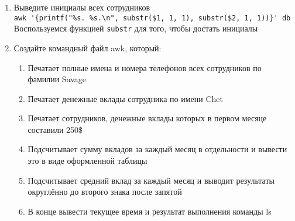 \documentclass[12pt, a4paper]{article}
\begin{document}
\begin{enumerate}
    \verb|awk -F ":" '/^Mike/ {printf("$%s, $%s, $%s\n", $3, $4, $5)}' db|\\
    Воспользуемся функцией \verb|printf| чтобы отформатировать строку согласно
    заданию
  \item Выведите инициалы всех сотрудников\\
    \verb|awk '{printf("%s. %s.\n", substr($1, 1, 1), substr($2, 1, 1))}' db|\\
    Воспользуемся функцией \verb|substr| для того, чтобы достать инициалы
  \item Создайте командный файл awk, который:
    \begin{enumerate}
      \item Печатает полные имена и номера телефонов всех сотрудников по фамилии Savage
      \item Печатает денежные вклады сотрудника по имени Chet
      \item Печатает сотрудников, денежные вклады которых в первом месяце составили 250\$
      \item Подсчитывает сумму вкладов за каждый месяц в отдельности и вывести это в виде оформленной таблицы
      \item Подсчитывает средний вклад за каждый месяц и выводит результаты округлённо до второго знака после запятой
      \item В конце вывести текущее время и результат выполнения команды ls
    \end{enumerate}
\end{enumerate}
\end{document}
